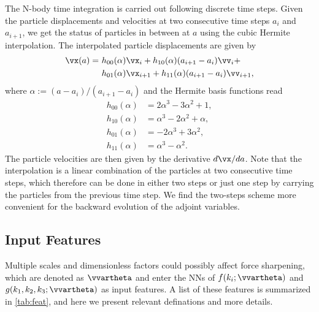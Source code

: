 \documentclass[modern, trackchanges, dvipsnames]{aastex631}
\renewcommand{\d}{d}
\begin{document}
The N-body time integration is carried out following discrete time steps.
Given the particle displacements and velocities at two consecutive time steps
$a_i$ and $a_{i+1}$, we get the status of particles in between at $a$ using the
cubic Hermite interpolation.
The interpolated particle displacements are given by
\begin{align}
  \vx(a) =\ &h_{00}(\alpha)\vx_i + h_{10}(\alpha)(a_{i+1} - a_i)\vv_i + \nonumber\\
           &h_{01}(\alpha)\vx_{i+1} + h_{11}(\alpha)(a_{i+1} - a_i)\vv_{i+1},
\end{align}
where $\alpha := (a - a_i)/(a_{i+1} - a_i)$ and the Hermite basis functions read
\begin{align}
  h_{00}(\alpha) &= 2\alpha^3 - 3\alpha^2 + 1, \nonumber\\
  h_{10}(\alpha) &= \alpha^3 - 2\alpha^2 + \alpha, \nonumber\\
  h_{01}(\alpha) &= -2\alpha^3 + 3\alpha^2, \nonumber\\
  h_{11}(\alpha) &= \alpha^3 - \alpha^2.
\end{align}
The particle velocities are then given by the derivative $\d\vx / \d a$.
Note that the interpolation is a linear combination of the particles at two
consecutive time steps, which therefore can be done in either two steps or just
one step by carrying the particles from the previous time step.
We find the two-steps scheme more convenient for the backward evolution of the
adjoint variables.


\vspace{1em}
\subsection{Input Features}
\label{sec:features}

Multiple scales and dimensionless factors could possibly affect force
sharpening, which are denoted as $\vvartheta$ and enter the NNs of $f(k_i;
\vvartheta)$ and $g(k_1, k_2, k_3; \vvartheta)$ as input features.
A list of these features is summarized in \autoref{tab:feat}, and here we
present relevant definations and more details.
\end{document}
